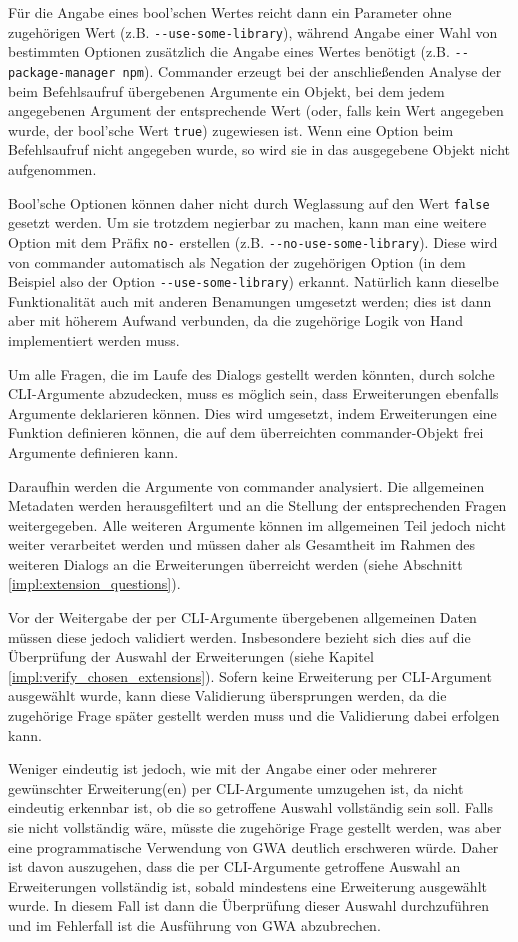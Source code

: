 Für die Angabe eines bool'schen Wertes reicht dann ein Parameter ohne zugehörigen Wert (z.B. \verb|--use-some-library|), während Angabe einer Wahl von bestimmten Optionen zusätzlich die Angabe eines Wertes benötigt (z.B. \verb|--package-manager npm|). Commander erzeugt bei der anschließenden Analyse der beim Befehlsaufruf übergebenen Argumente ein Objekt, bei dem jedem angegebenen Argument der entsprechende Wert (oder, falls kein Wert angegeben wurde, der bool'sche Wert \verb|true|) zugewiesen ist. Wenn eine Option beim Befehlsaufruf nicht angegeben wurde, so wird sie in das ausgegebene Objekt nicht aufgenommen.

Bool'sche Optionen können daher nicht durch Weglassung auf den Wert \verb|false| gesetzt werden. Um sie trotzdem negierbar zu machen, kann man eine weitere Option mit dem Präfix \verb|no-| erstellen (z.B. \verb|--no-use-some-library|). Diese wird von commander automatisch als Negation der zugehörigen Option (in dem Beispiel also der Option \verb|--use-some-library|) erkannt. Natürlich kann dieselbe Funktionalität auch mit anderen Benamungen umgesetzt werden; dies ist dann aber mit höherem Aufwand verbunden, da die zugehörige Logik von Hand implementiert werden muss.

Um alle Fragen, die im Laufe des Dialogs gestellt werden könnten, durch solche \gls{CLI}-Argumente abzudecken, muss es möglich sein, dass Erweiterungen ebenfalls Argumente deklarieren können. Dies wird umgesetzt, indem Erweiterungen eine Funktion definieren können, die auf dem überreichten commander-Objekt frei Argumente definieren kann.

Daraufhin werden die Argumente von commander analysiert. Die allgemeinen Metadaten werden herausgefiltert und an die Stellung der entsprechenden Fragen weitergegeben. Alle weiteren Argumente können im allgemeinen Teil jedoch nicht weiter verarbeitet werden und müssen daher als Gesamtheit im Rahmen des weiteren Dialogs an die Erweiterungen überreicht werden (siehe Abschnitt \ref{impl:extension_questions}).

Vor der Weitergabe der per \gls{CLI}-Argumente übergebenen allgemeinen Daten müssen diese jedoch validiert werden. Insbesondere bezieht sich dies auf die Überprüfung der Auswahl der Erweiterungen (siehe Kapitel \ref{impl:verify_chosen_extensions}). Sofern keine Erweiterung per \gls{CLI}-Argument ausgewählt wurde, kann diese Validierung übersprungen werden, da die zugehörige Frage später gestellt werden muss und die Validierung dabei erfolgen kann.

Weniger eindeutig ist jedoch, wie mit der Angabe einer oder mehrerer gewünschter Erweiterung(en) per \gls{CLI}-Argumente umzugehen ist, da nicht eindeutig erkennbar ist, ob die so getroffene Auswahl vollständig sein soll. Falls sie nicht vollständig wäre, müsste die zugehörige Frage gestellt werden, was aber eine programmatische Verwendung von \gls{GWA} deutlich erschweren würde. Daher ist davon auszugehen, dass die per \gls{CLI}-Argumente getroffene Auswahl an Erweiterungen vollständig ist, sobald mindestens eine Erweiterung ausgewählt wurde. In diesem Fall ist dann die Überprüfung dieser Auswahl durchzuführen und im Fehlerfall ist die Ausführung von \gls{GWA} abzubrechen.

